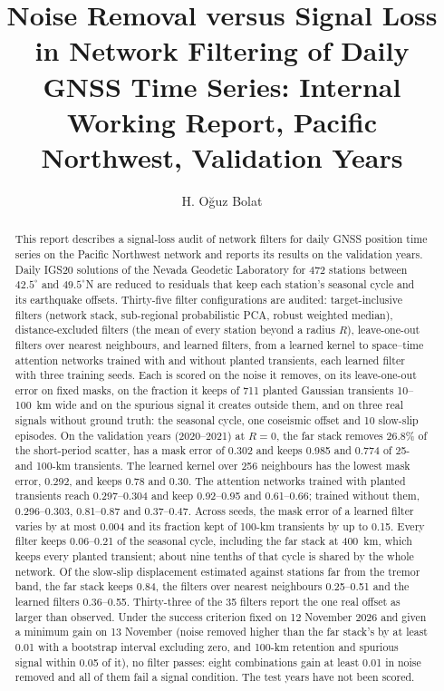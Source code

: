 \documentclass[preprint,12pt,authoryear]{elsarticle}
\begin{document}
\begin{frontmatter}

  \title{Noise Removal versus Signal Loss in Network Filtering of Daily GNSS Time Series: Internal Working Report, Pacific Northwest, Validation Years}

  \author{H. O\u{g}uz Bolat}

  \begin{abstract}
    This report describes a signal-loss audit of network filters for daily GNSS position time series on the Pacific Northwest network and reports its results on the validation years. Daily IGS20 solutions of the Nevada Geodetic Laboratory for 472 stations between $42.5^\circ$ and $49.5^\circ$N are reduced to residuals that keep each station's seasonal cycle and its earthquake offsets. Thirty-five filter configurations are audited: target-inclusive filters (network stack, sub-regional probabilistic PCA, robust weighted median), distance-excluded filters (the mean of every station beyond a radius $R$), leave-one-out filters over nearest neighbours, and learned filters, from a learned kernel to space--time attention networks trained with and without planted transients, each learned filter with three training seeds. Each is scored on the noise it removes, on its leave-one-out error on fixed masks, on the fraction it keeps of 711 planted Gaussian transients 10--100~km wide and on the spurious signal it creates outside them, and on three real signals without ground truth: the seasonal cycle, one coseismic offset and 10 slow-slip episodes. On the validation years (2020--2021) at $R = 0$, the far stack removes 26.8\% of the short-period scatter, has a mask error of 0.302 and keeps 0.985 and 0.774 of 25- and 100-km transients. The learned kernel over 256 neighbours has the lowest mask error, 0.292, and keeps 0.78 and 0.30. The attention networks trained with planted transients reach 0.297--0.304 and keep 0.92--0.95 and 0.61--0.66; trained without them, 0.296--0.303, 0.81--0.87 and 0.37--0.47. Across seeds, the mask error of a learned filter varies by at most 0.004 and its fraction kept of 100-km transients by up to 0.15. Every filter keeps 0.06--0.21 of the seasonal cycle, including the far stack at 400~km, which keeps every planted transient; about nine tenths of that cycle is shared by the whole network. Of the slow-slip displacement estimated against stations far from the tremor band, the far stack keeps 0.84, the filters over nearest neighbours 0.25--0.51 and the learned filters 0.36--0.55. Thirty-three of the 35 filters report the one real offset as larger than observed. Under the success criterion fixed on 12 November 2026 and given a minimum gain on 13 November (noise removed higher than the far stack's by at least 0.01 with a bootstrap interval excluding zero, and 100-km retention and spurious signal within 0.05 of it), no filter passes: eight combinations gain at least 0.01 in noise removed and all of them fail a signal condition. The test years have not been scored.
  \end{abstract}


\end{frontmatter}
\end{document}

